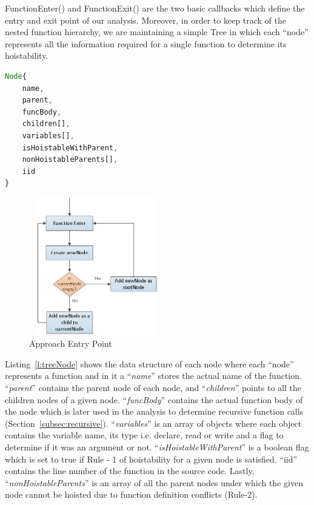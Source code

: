 \documentclass[authoryear,preprint]{sigplanconf}
\begin{document}
FunctionEnter() and FunctionExit() are the two basic callbacks which define the entry and exit point of our analysis. Moreover, in order to keep track of the nested function hierarchy, we are maintaining a simple Tree in which each  \enquote{node} represents all the information required for a single function to determine its hoistability.

\lstset{numbers=left, numberstyle=\tiny, stepnumber=1, numbersep=5pt}
\lstset{basicstyle=\ttfamily}
\lstset{frame=tb, frame=bottomline}

\begin{lstlisting}[float,caption= TreeNode Structure ,label=l:treeNode,language=JavaScript]
Node{
	name,
	parent,
	funcBody,
	children[],
	variables[],
	isHoistableWithParent,
	nonHoistableParents[],
	iid
}

\end{lstlisting} 

\begin{figure}[H]
  \centering
  \includegraphics[width=6cm, height=6cm]{approach1.png}
  \caption{Approach Entry Point}
  \label{fig:approach1}
\end{figure}

Listing~\ref{l:treeNode} shows the data structure of each node where each \enquote{node} represents a function and in it a \enquote{\textit{name}} stores the actual name of the function. \enquote{\textit{parent}} contains the parent node of each node, and \enquote{\textit{children}} points to all the children nodes of a given node. \enquote{\textit{funcBody}} contains the actual function body of the node which is later used in the analysis to determine recursive function calls (Section~\ref{subsec:recursive}). \enquote{\textit{variables}} is an array of objects where each object contains the variable name, its type i.e. declare, read or write and a flag to determine if it was an argument or not. \enquote{\textit{isHoistableWithParent}} is a boolean flag which is set to true if Rule - 1 of hoistability for a given node is satisfied. \enquote{iid} contains the line number of the function in the source code. Lastly, \enquote{\textit{nonHoistableParents}} is an array of all the parent nodes under which the given node cannot be hoisted due to function definition conflicts (Rule-2). \par
\end{document}
